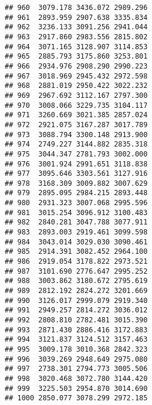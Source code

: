\documentclass[
]{article}
\begin{document}
\begin{verbatim}
## 960  3079.178 3436.072 2989.296
## 961  2893.959 2907.638 3335.834
## 962  3236.133 3091.256 2941.044
## 963  2917.860 2983.556 2815.802
## 964  3071.165 3128.907 3114.853
## 965  2885.793 3175.860 3253.801
## 966  2934.976 2908.290 2990.223
## 967  3018.969 2945.432 2972.598
## 968  2881.019 2950.422 3022.232
## 969  2967.692 3112.167 2797.300
## 970  3008.066 3229.735 3104.117
## 971  3260.669 3021.385 2857.024
## 972  2921.075 3167.287 3017.789
## 973  3088.794 3300.148 2913.900
## 974  2749.227 3144.882 2835.318
## 975  3044.347 2781.793 3002.000
## 976  3001.924 2991.651 3118.838
## 977  3095.646 3303.561 3127.916
## 978  3168.309 3009.882 3007.629
## 979  2895.095 2984.215 2893.448
## 980  2931.323 3007.068 2995.596
## 981  3015.254 3096.912 3100.483
## 982  2840.281 3047.788 3077.911
## 983  2893.003 2919.461 3099.598
## 984  3043.014 3029.030 3090.461
## 985  2914.391 3082.452 2964.100
## 986  2919.054 3178.822 2973.521
## 987  3101.690 2776.647 2995.252
## 988  3003.862 3180.672 2795.619
## 989  2812.192 2824.272 3201.669
## 990  3126.017 2999.079 2919.340
## 991  2949.257 2814.272 3036.012
## 992  2808.810 2782.481 3015.390
## 993  2871.430 2886.416 3172.883
## 994  3121.837 3124.512 3157.463
## 995  3009.178 3010.368 2842.323
## 996  3039.269 2948.649 2975.080
## 997  2738.301 2794.773 3005.506
## 998  3020.468 3072.780 3144.420
## 999  3225.503 2954.870 3014.690
## 1000 2850.077 3078.299 2972.185
\end{verbatim}
\end{document}
